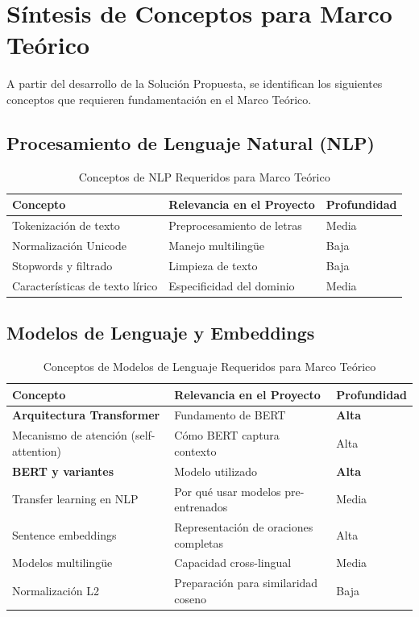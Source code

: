 \section{Síntesis de Conceptos para Marco Teórico}
\label{sec:sintesis-marco-teorico}

A partir del desarrollo de la Solución Propuesta, se identifican los siguientes conceptos que requieren fundamentación en el Marco Teórico.

\subsection{Procesamiento de Lenguaje Natural (NLP)}

\begin{table}[htbp]
\centering
\caption{Conceptos de NLP Requeridos para Marco Teórico}
\label{tab:conceptos-nlp}
\begin{tabular}{lll}
\toprule
\textbf{Concepto} & \textbf{Relevancia en el Proyecto} & \textbf{Profundidad} \\
\midrule
Tokenización de texto & Preprocesamiento de letras & Media \\
Normalización Unicode & Manejo multilingüe & Baja \\
Stopwords y filtrado & Limpieza de texto & Baja \\
Características de texto lírico & Especificidad del dominio & Media \\
\bottomrule
\end{tabular}
\end{table}

\subsection{Modelos de Lenguaje y Embeddings}

\begin{table}[htbp]
\centering
\caption{Conceptos de Modelos de Lenguaje Requeridos para Marco Teórico}
\label{tab:conceptos-modelos}
\begin{tabular}{lll}
\toprule
\textbf{Concepto} & \textbf{Relevancia en el Proyecto} & \textbf{Profundidad} \\
\midrule
\textbf{Arquitectura Transformer} & Fundamento de BERT & \textbf{Alta} \\
Mecanismo de atención (self-attention) & Cómo BERT captura contexto & Alta \\
\textbf{BERT y variantes} & Modelo utilizado & \textbf{Alta} \\
Transfer learning en NLP & Por qué usar modelos pre-entrenados & Media \\
Sentence embeddings & Representación de oraciones completas & Alta \\
Modelos multilingüe & Capacidad cross-lingual & Media \\
Normalización L2 & Preparación para similaridad coseno & Baja \\
\bottomrule
\end{tabular}
\end{table}

